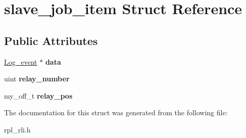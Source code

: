 \hypertarget{structslave__job__item}{}\section{slave\+\_\+job\+\_\+item Struct Reference}
\label{structslave__job__item}
\subsection*{Public Attributes}
\begin{DoxyCompactItemize}
\item 
\mbox{\label{structslave__job__item_a222fbd4be26f4e4d8a53615f934c73a5}} 
\mbox{\hyperlink{classLog__event}{Log\+\_\+event}} $\ast$ {\bfseries data}
\item 
\mbox{\label{structslave__job__item_a71cffbb571380b58b35d3b56ee7297ed}} 
uint {\bfseries relay\+\_\+number}
\item 
\mbox{\label{structslave__job__item_a566808f6c83d97e52c6ad49bed042324}} 
my\+\_\+off\+\_\+t {\bfseries relay\+\_\+pos}
\end{DoxyCompactItemize}


The documentation for this struct was generated from the following file\+:\begin{DoxyCompactItemize}
\item 
rpl\+\_\+rli.\+h\end{DoxyCompactItemize}

